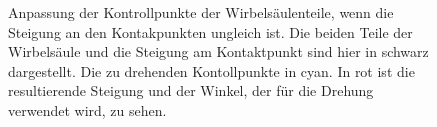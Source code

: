 \begin{figure}
 \qquad
 \caption{Anpassung der Kontrollpunkte der Wirbelsäulenteile, wenn die Steigung an den Kontakpunkten ungleich ist. Die beiden Teile der Wirbelsäule und die Steigung am Kontaktpunkt sind hier in schwarz dargestellt. Die zu drehenden Kontollpunkte in cyan. In rot ist die resultierende Steigung und der Winkel, der für die Drehung verwendet wird, zu sehen.}
 \label{smooth_spine}
\end{figure}





